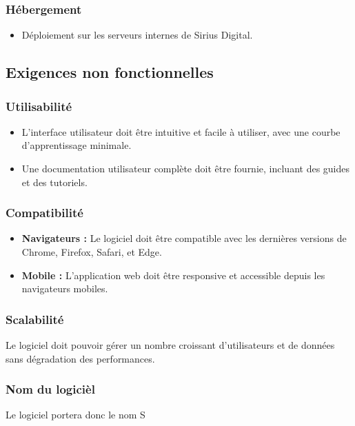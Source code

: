 \subsubsection{Hébergement}
\begin{itemize}
    \item Déploiement sur les serveurs internes de Sirius Digital.
\end{itemize}
\subsection{Exigences non fonctionnelles}



\subsubsection{Utilisabilité}
\begin{itemize}
    \item L'interface utilisateur doit être intuitive et facile à utiliser, avec une courbe d'apprentissage minimale.
    \item Une documentation utilisateur complète doit être fournie, incluant des guides et des tutoriels.
\end{itemize}

\subsubsection{Compatibilité}
\begin{itemize}
    \item \textbf{Navigateurs :} Le logiciel doit être compatible avec les dernières versions de Chrome, Firefox, Safari, et Edge.
    \item \textbf{Mobile :} L'application web doit être responsive et accessible depuis les navigateurs mobiles.
\end{itemize}

\subsubsection{Scalabilité}
Le logiciel doit pouvoir gérer un nombre croissant d'utilisateurs et de données sans dégradation des performances.


\subsubsection{Nom du logicièl}
Le logiciel portera donc le nom S


